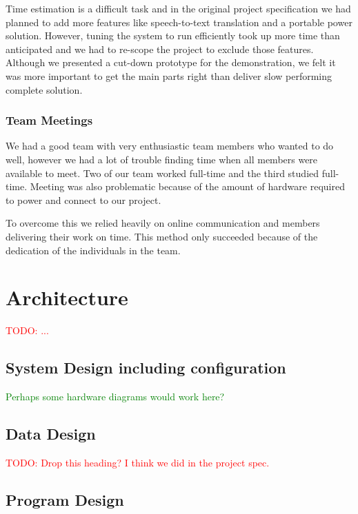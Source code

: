 \documentclass[11pt,a4paper,titlepage]{report}
\begin{document}
Time estimation is a difficult task and in the original project specification we had planned to add more features like speech-to-text translation and a portable power solution. However, tuning the system to run efficiently took up more time than anticipated and we had to re-scope the project to exclude those features. Although we presented a cut-down prototype for the demonstration, we felt it was more important to get the main parts right than deliver slow performing complete solution.


\subsubsection{Team Meetings}

We had a good team with very enthusiastic team members who wanted to do well, however we had a lot of trouble finding time when all members were available to meet. Two of our team worked full-time and the third studied full-time. Meeting was also problematic because of the amount of hardware required to power and connect to our project.

To overcome this we relied heavily on online communication and members delivering their work on time. This method only succeeded because of the dedication of the individuals in the team.


\section{Architecture}

\textcolor{red}{TODO: ...}

\subsection{System Design including configuration}

\textcolor{green}{Perhaps some hardware diagrams would work here?}

\subsection{Data Design}

\textcolor{red}{TODO: Drop this heading? I think we did in the project spec.}

\subsection{Program Design}
\end{document}

